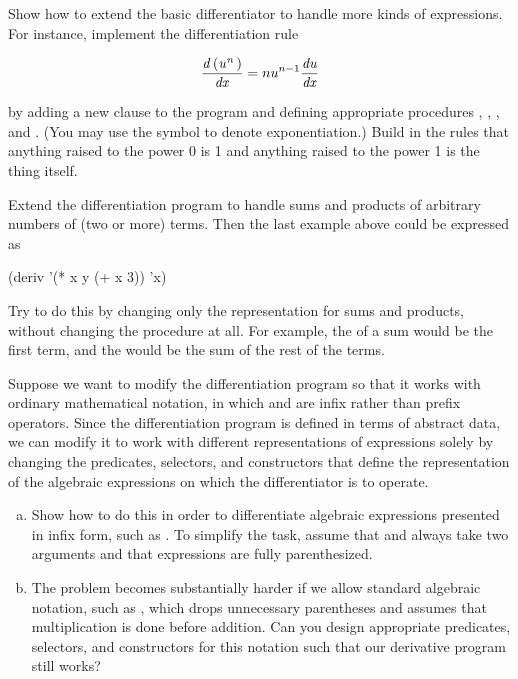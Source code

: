 \begin{exerciseGroup}
\label{Exercise 2.56}
 Show how to extend the basic
differentiator to handle more kinds of expressions.  For instance, implement
the differentiation rule

$$ \frac{{\it d\,(u^n\,)}}{{\it dx}} = nu^{n-1} \frac{{\it du}}{{\it dx}} $$

\noindent
by adding a new clause to the  program and defining appropriate
procedures , , , and
.  (You may use the symbol \code{**} to denote
exponentiation.)  Build in the rules that anything raised to the power 0 is 1
and anything raised to the power 1 is the thing itself.

\label{Exercise 2.57}
 Extend the differentiation
program to handle sums and products of arbitrary numbers of (two or more)
terms.  Then the last example above could be expressed as

\begin{codeBlock}
(deriv '(* x y (+ x 3)) 'x)
\end{codeBlock}

Try to do this by changing only the representation for sums and products,
without changing the  procedure at all.  For example, the
 of a sum would be the first term, and the  would be
the sum of the rest of the terms.

\label{Exercise 2.58}
 Suppose we want to modify the
differentiation program so that it works with ordinary mathematical notation,
in which \code{+} and \code{*} are infix rather than prefix operators.  Since
the differentiation program is defined in terms of abstract data, we can modify
it to work with different representations of expressions solely by changing the
predicates, selectors, and constructors that define the representation of the
algebraic expressions on which the differentiator is to operate.

\begin{enumerate}[a.]

\item
Show how to do this in order to differentiate algebraic expressions presented
in infix form, such as .  To simplify the task,
assume that \code{+} and \code{*} always take two arguments and that
expressions are fully parenthesized.

\item
The problem becomes substantially harder if we allow standard algebraic
notation, such as , which drops unnecessary
parentheses and assumes that multiplication is done before addition.  Can you
design appropriate predicates, selectors, and constructors for this notation
such that our derivative program still works?

\end{enumerate}
\end{exerciseGroup}


